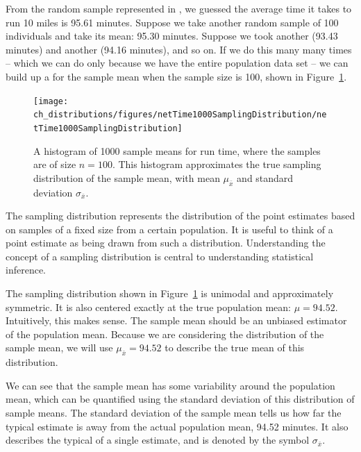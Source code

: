 From the random sample represented in , we guessed the average time it takes to run 10 miles is 95.61 minutes. Suppose we take another random sample of 100 individuals and take its mean: 95.30 minutes. Suppose we took another (93.43 minutes) and another (94.16 minutes), and so on. If we do this many many times -- which we can do only because we have the entire population data set -- we can build up a  for the sample mean when the sample size is 100, shown in Figure~\ref{netTime1000SamplingDistribution}.

\begin{figure}
   \centering
   \texttt{[image: ch\_distributions/figures/netTime1000SamplingDistribution/netTime1000SamplingDistribution]}
   \caption{A histogram of 1000 sample means for run time, where the samples are of size $n=100$.  This histogram approximates the true sampling distribution of the sample mean, with mean $\mu_{\bar{x}}$ and standard deviation $\sigma_{\bar{x}}$. }
   \label{netTime1000SamplingDistribution}
\end{figure}

\begin{termBox}{
The sampling distribution represents the distribution of the point estimates based on samples of a fixed size from a certain population. It is useful to think of a point estimate as being drawn from such a distribution. Understanding the concept of a sampling distribution is central to understanding statistical inference.}
\end{termBox}

The sampling distribution shown in Figure~\ref{netTime1000SamplingDistribution} is unimodal and approximately symmetric. It is also centered exactly at the true population mean: $\mu=94.52$. Intuitively, this makes sense. The sample mean should be an unbiased estimator of the population mean. Because we are considering the distribution of the sample mean, we will use $\mu_{\bar{x}} = 94.52$ to describe the true mean of this distribution.

We can see that the sample mean has some variability around the population mean, which can be quantified using the standard deviation of this distribution of sample means. The standard deviation of the sample mean tells us how far the typical estimate is away from the actual population mean, 94.52 minutes.  It also describes the typical  of a single estimate, and is denoted by the symbol $\sigma_{\bar{x}}$. 

